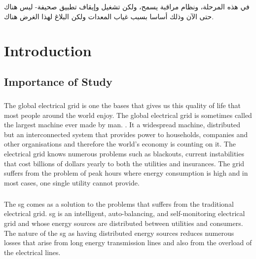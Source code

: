 \documentclass[oneside,12pt,a4paper,final]{book}
\begin{document}
\paragraph{}
\begin{arabtex}

في هذه المرحلة، ونظام مراقبة يسمح، ولكن تشغيل وإيقاف تطبيق صحيفة-
 ليس هناك حتى الآن وذلك أساسا بسبب غياب المعدات ولكن البلاغ لهذا الغرض هناك.
\end{arabtex}

\singlespacing

\tableofcontents
\listoffigures
\listoftables
\printglossaries

\mainmatter
\doublespacing
\chapter{Introduction}

\section{Importance of Study}
\paragraph{}
The global electrical grid is one the bases that gives us this quality of life that most people around the world enjoy. The global electrical grid is sometimes called the largest machine ever made by man. \cite{ref1}. It a widespread machine, distributed but an interconnected system that provides power to households, companies and other organisations and therefore the world's economy is counting on it. The electrical grid knows numerous problems such as blackouts, current instabilities that cost billions of dollars yearly to both the utilities and insurances. The grid suffers from the problem of peak hours where energy consumption is high and in most cases, one single utility cannot provide.
\paragraph{}
The \gls{sg} comes as a solution to the problems that suffers from the traditional electrical grid. \gls{sg} is an intelligent, auto-balancing, and self-monitoring electrical grid \cite{ref2} and whose energy sources are distributed between utilities and consumers. The nature of the \gls{sg} as having distributed energy sources reduces numerous losses that arise from long energy transmission lines and also from the overload of the electrical lines.
\end{document}
